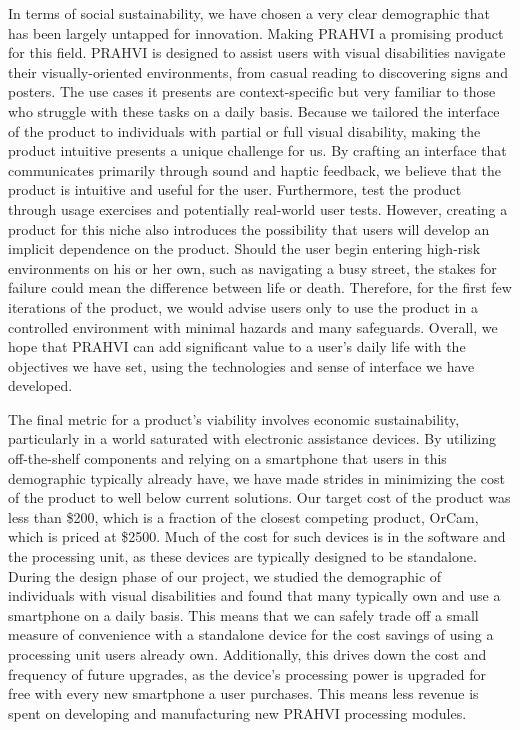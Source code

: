 	In terms of social sustainability, we have chosen a very clear demographic that has been largely untapped for innovation. Making PRAHVI a promising product for this field. PRAHVI is designed to assist users with visual disabilities navigate their visually-oriented environments, from casual reading to discovering signs and posters. The use cases it presents are context-specific but very familiar to those who struggle with these tasks on a daily basis. Because we tailored the interface of the product to individuals with partial or full visual disability, making the product intuitive presents a unique challenge for us. By crafting an interface that communicates primarily through sound and haptic feedback, we believe that the product is intuitive and useful for the user. Furthermore, test the product through usage exercises and potentially real-world user tests. However, creating a product for this niche also introduces the possibility that users will develop an implicit dependence on the product. Should the user begin entering high-risk environments on his or her own, such as navigating a busy street, the stakes for failure could mean the difference between life or death. Therefore, for the first few iterations of the product, we would advise users only to use the product in a controlled environment with minimal hazards and many safeguards. Overall, we hope that PRAHVI can add significant value to a user's daily life with the objectives we have set, using the technologies and sense of interface we have developed.
	
	The final metric for a product's viability involves economic sustainability, particularly in a world saturated with electronic assistance devices. By utilizing off-the-shelf components and relying on a smartphone that users in this demographic typically already have, we have made strides in minimizing the cost of the product to well below current solutions. Our target cost of the product was less than \$200, which is a fraction of the closest competing product, OrCam, which is priced at \$2500. Much of the cost for such devices is in the software and the processing unit, as these devices are typically designed to be standalone. During the design phase of our project, we studied the demographic of individuals with visual disabilities and found that many typically own and use a smartphone on a daily basis. This means that we can safely trade off a small measure of convenience with a standalone device for the cost savings of using a processing unit users already own. Additionally, this drives down the cost and frequency of future upgrades, as the device's processing power is upgraded for free with every new smartphone a user purchases. This means less revenue is spent on developing and manufacturing new PRAHVI processing modules.
	
